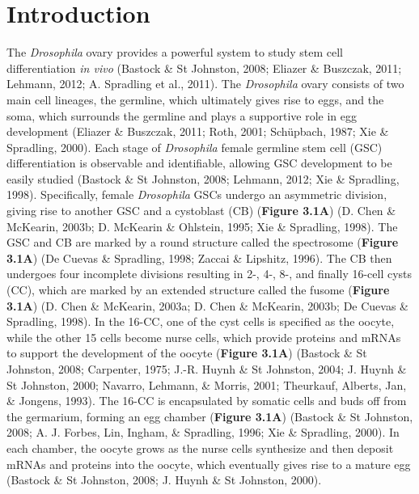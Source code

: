\documentclass[12pt,oneside]{reedthesis}
\begin{document}
\hypertarget{introduction-2}{%
\section{Introduction}\label{introduction-2}}

The \emph{Drosophila} ovary provides a powerful system to study stem cell
differentiation \emph{in vivo} (Bastock \& St Johnston, 2008; Eliazer \& Buszczak, 2011; Lehmann, 2012; A. Spradling et al., 2011). The \emph{Drosophila} ovary consists of two main cell
lineages, the germline, which ultimately gives rise to eggs, and the
soma, which surrounds the germline and plays a supportive role in egg
development (Eliazer \& Buszczak, 2011; Roth, 2001; Schüpbach, 1987; Xie \& Spradling, 2000). Each stage of \emph{Drosophila} female germline stem cell (GSC)
differentiation is observable and identifiable, allowing GSC development
to be easily studied (Bastock \& St Johnston, 2008; Lehmann, 2012; Xie \& Spradling, 1998). Specifically, female
\emph{Drosophila} GSCs undergo an asymmetric division, giving rise to another
GSC and a cystoblast (CB) (\textbf{Figure 3.1A}) (D. Chen \& McKearin, 2003b; D. McKearin \& Ohlstein, 1995; Xie \& Spradling, 1998). The GSC and CB are marked by a round
structure called the spectrosome (\textbf{Figure 3.1A}) (De Cuevas \& Spradling, 1998; Zaccai \& Lipshitz, 1996). The CB then undergoes four incomplete divisions
resulting in 2-, 4-, 8-, and finally 16-cell cysts (CC), which are
marked by an extended structure called the fusome (\textbf{Figure 3.1A})
(D. Chen \& McKearin, 2003a; D. Chen \& McKearin, 2003b; De Cuevas \& Spradling, 1998). In the 16-CC, one of the
cyst cells is specified as the oocyte, while the other 15 cells become
nurse cells, which provide proteins and mRNAs to support the development
of the oocyte (\textbf{Figure 3.1A}) (Bastock \& St Johnston, 2008; Carpenter, 1975; J.-R. Huynh \& St Johnston, 2004; J. Huynh \& St Johnston, 2000; Navarro, Lehmann, \& Morris, 2001; Theurkauf, Alberts, Jan, \& Jongens, 1993). The 16-CC is encapsulated by
somatic cells and buds off from the germarium, forming an egg chamber
(\textbf{Figure 3.1A}) (Bastock \& St Johnston, 2008; A. J. Forbes, Lin, Ingham, \& Spradling, 1996; Xie \& Spradling, 2000). In each
chamber, the oocyte grows as the nurse cells synthesize and then deposit
mRNAs and proteins into the oocyte, which eventually gives rise to a
mature egg (Bastock \& St Johnston, 2008; J. Huynh \& St Johnston, 2000).
\end{document}
